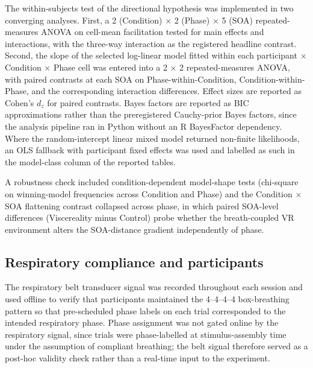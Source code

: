 The within-subjects test of the directional hypothesis was implemented in two converging analyses. First, a 2 (Condition) $\times$ 2 (Phase) $\times$ 5 (SOA) repeated-measures ANOVA on cell-mean facilitation tested for main effects and interactions, with the three-way interaction as the registered headline contrast. Second, the slope of the selected log-linear model fitted within each participant $\times$ Condition $\times$ Phase cell was entered into a 2 $\times$ 2 repeated-measures ANOVA, with paired contrasts at each SOA on Phase-within-Condition, Condition-within-Phase, and the corresponding interaction differences. Effect sizes are reported as Cohen's $d_{z}$ for paired contrasts. Bayes factors are reported as BIC approximations rather than the preregistered Cauchy-prior Bayes factors, since the analysis pipeline ran in Python without an R BayesFactor dependency. Where the random-intercept linear mixed model returned non-finite likelihoods, an OLS fallback with participant fixed effects was used and labelled as such in the model-class column of the reported tables.

A robustness check included condition-dependent model-shape tests (chi-square on winning-model frequencies across Condition and Phase) and the Condition $\times$ SOA flattening contrast collapsed across phase, in which paired SOA-level differences (Viscereality minus Control) probe whether the breath-coupled VR environment alters the SOA-distance gradient independently of phase.

\subsection{Respiratory compliance and participants}

The respiratory belt transducer signal was recorded throughout each session and used offline to verify that participants maintained the 4--4--4--4 box-breathing pattern so that pre-scheduled phase labels on each trial corresponded to the intended respiratory phase. Phase assignment was not gated online by the respiratory signal, since trials were phase-labelled at stimulus-assembly time under the assumption of compliant breathing; the belt signal therefore served as a post-hoc validity check rather than a real-time input to the experiment.

